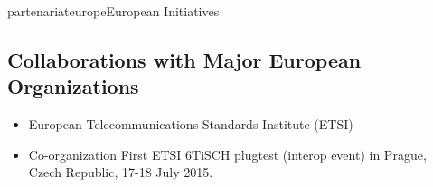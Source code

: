 \documentclass{ra2016}
\begin{document}
\begin{module}{partenariat}{europe}{European Initiatives}
\subsection{Collaborations with Major European Organizations}
\begin{itemize}
    \item European Telecommunications Standards Institute (ETSI)
    \item Co-organization First ETSI 6TiSCH plugtest (interop event) in Prague, Czech Republic, 17-18 July 2015.
\end{itemize}



\end{module}


 
\end{document}
